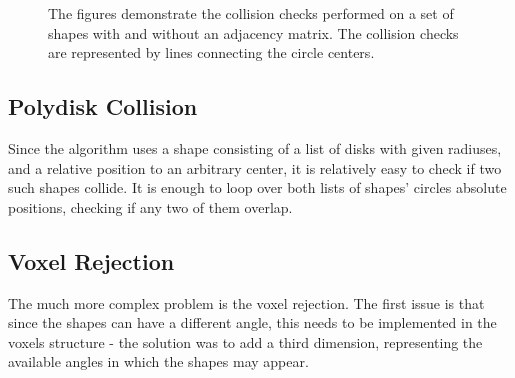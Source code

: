 \documentclass[12pt, oneside]{report}
\begin{document}
\begin{figure}[H]
\caption{The figures demonstrate the collision checks performed on a set of shapes with and without an adjacency matrix. The collision checks are represented by lines connecting the circle centers.}
\end{figure}

\subsection{Polydisk Collision}

Since the algorithm uses a shape consisting of a list of disks with given radiuses, and a relative position to an arbitrary center, it is relatively easy to check if two such shapes collide. It is enough to loop over both lists of shapes' circles absolute positions, checking if any two of them overlap. \newline

\subsection{Voxel Rejection}

The much more complex problem is the voxel rejection. The first issue is that since the shapes can have a different angle, this needs to be implemented in the voxels structure - the solution was to add a third dimension, representing the available angles in which the shapes may appear. \newline
\end{document}
